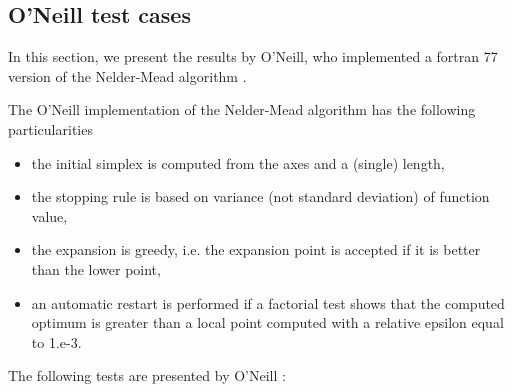\subsection{O'Neill test cases}

In this section, we present the results by O'Neill, who 
implemented a fortran 77 version of the Nelder-Mead algorithm
\cite{O'Neill1971AAF}.

The O'Neill implementation of the Nelder-Mead algorithm has the following 
particularities 
\begin{itemize}
\item the initial simplex is computed from the axes and a (single) length,
\item the stopping rule is based on variance (not standard deviation) of function value,
\item the expansion is greedy, i.e. the expansion point is accepted if it is better than the lower point,
\item an automatic restart is performed if a factorial test shows that the 
computed optimum is greater than a local point computed with a relative 
epsilon equal to 1.e-3.
\end{itemize}

The following tests are presented by O'Neill :

